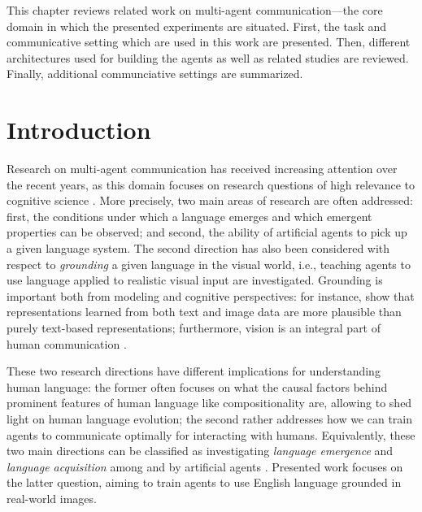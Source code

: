 
This chapter reviews related work on multi-agent communication---the core domain in which the presented experiments are situated. First, the task and communicative setting which are used in this work are presented. Then, different architectures used for building the agents as well as related studies are reviewed. Finally, additional communciative settings are summarized. 


\section{Introduction}
Research on multi-agent communication has received increasing attention over the recent years, as this domain focuses on research questions of high relevance to cognitive science \parencite{lazaridou2020emergent}. More precisely, two main areas of research are often addressed: first, the conditions under which a language emerges and which emergent properties can be observed; and second, the ability of artificial agents to pick up a given language system. %
The second direction has also been considered with respect to \textit{grounding} a given language in the visual world, i.e., teaching agents to use language applied to realistic visual input are investigated. Grounding is important both from modeling and cognitive perspectives: for instance, \cite{bruni2014multimodal} show that representations learned from both text and image data are more plausible than purely text-based representations; furthermore, vision is an integral part of human communication \parencite{tomasello2010origins, harnad1990symbol}. 

These two research directions have different implications for understanding human language: the former often focuses on what the causal factors behind prominent features of human language like compositionality are, allowing to shed light on human language evolution; the second rather addresses how we can train agents to communicate optimally for interacting with humans. Equivalently, these two main directions can be classified as investigating \textit{language emergence} and \textit{language acquisition} among and by artificial agents \parencite{lazaridou2018emergence, lazaridou2020emergent}.
Presented work focuses on the latter question, aiming to train agents to use English language grounded in real-world images.

